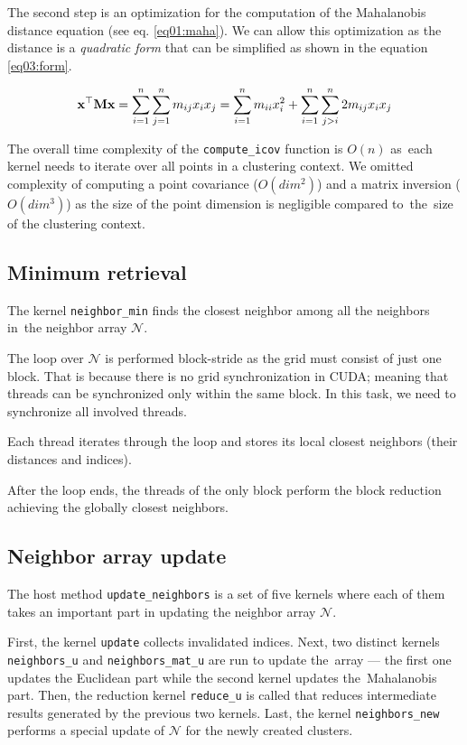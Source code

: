 The second step is an optimization for the computation of the Mahalanobis distance equation (see eq. \ref{eq01:maha}). We can allow this optimization as the distance is a \emph{quadratic form} that can be simplified as shown in the equation \ref{eq03:form}.

\begin{equation}
\mathbf{x}^\top\mathbf{M}\mathbf{x} = \sum_{i=1}^{n}\sum_{j=1}^{n}{m_{ij}x_ix_j} = \sum_{i=1}^{n}{m_{ii}x_i^2} + \sum_{i=1}^{n}\sum_{j>i}^{n}{2m_{ij}x_ix_j}
\label{eq03:form}
\end{equation}


\begin{rem}
The overall time complexity of the \texttt{compute\_icov} function is $O(n)$ as~each kernel needs to iterate over all points in a clustering context. We omitted complexity of computing a point covariance ($O(dim^2)$) and a matrix inversion ($O(dim^3)$) as the size of the point dimension is negligible compared to~the~size of the clustering context.
\end{rem}

\subsection{Minimum retrieval}

The kernel \texttt{neighbor\_min} finds the closest neighbor among all the neighbors in~the neighbor array $\mathcal{N}$.

The loop over $\mathcal{N}$ is performed block-stride as the grid must consist of just one block. That is because there is no grid synchronization in CUDA; meaning that threads can be synchronized only within the same block. In this task, we need to synchronize all involved threads.

Each thread iterates through the loop and stores its local closest neighbors (their distances and indices).

After the loop ends, the threads of the only block perform the block reduction achieving the globally closest neighbors.

\subsection{Neighbor array update}

The host method \texttt{update\_neighbors} is a set of five kernels where each of them takes an important part in updating the neighbor array $\mathcal{N}$.

First, the kernel \texttt{update} collects invalidated indices. Next, two distinct kernels \texttt{neighbors\_u} and \texttt{neighbors\_mat\_u} are run to update the~array --- the first one updates the Euclidean part while the second kernel updates the~Mahalanobis part. Then, the reduction kernel \texttt{reduce\_u} is called that reduces intermediate results generated by the previous two kernels. Last, the kernel \texttt{neighbors\_new} performs a special update of $\mathcal{N}$ for the newly created clusters.

